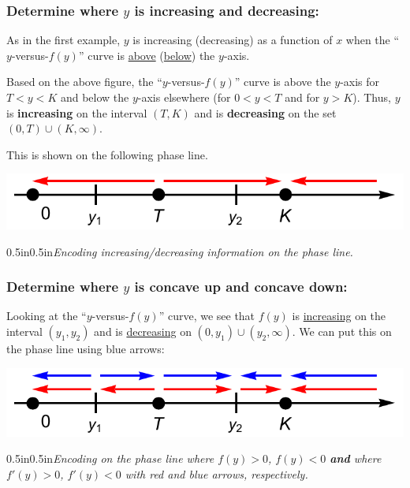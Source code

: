 \documentclass[12pt]{article}
\theoremstyle{definition}
\theoremstyle{underl}
\newcommand{\capt}[1]{\begin{adjustwidth}{0.5in}{0.5in}\centering\small\textit{#1}\end{adjustwidth}}
\begin{document}
	\subsubsection*{Determine where $y$ is increasing and decreasing:}\par
	As in the first example, $y$ is increasing (decreasing) as a function of $x$ when the ``$y$-versus-$f(y)$'' curve is \ul{above} (\ul{below}) the $y$-axis.
	
	Based on the above figure, the ``$y$-versus-$f(y)$'' curve is above the $y$-axis for $T<y<K$ and below the $y$-axis elsewhere (for $0<y<T$ and for $y>K$). Thus, $y$ is \textbf{increasing} on the interval $(T,K)$ and is \textbf{decreasing} on the set $(0,T)\cup(K,\infty)$.
	
	This is shown on the following phase line.
	
	\begin{center}
		\includegraphics[align=c,scale=0.75]{Ex2_Phase_3}
		\vspace{1.5mm}
		\capt{Encoding increasing/decreasing information on the phase line.}
	\end{center}

	\subsubsection*{Determine where $y$ is concave up and concave down:}\par
	Looking at the ``$y$-versus-$f(y)$'' curve, we see that $f(y)$ is \ul{increasing} on the interval $(y_1,y_2)$ and is \ul{decreasing} on $(0,y_1)\cup(y_2,\infty)$. We can put this on the phase line using blue arrows:
	\begin{center}
		\includegraphics[align=c,scale=0.75]{Ex2_Phase_4}
		\vspace{1.5mm}
		\capt{Encoding on the phase line where $f(y)>0$, $f(y)<0$ \textbf{and} where $f'(y)>0$, $f'(y)<0$ with red and blue arrows, respectively.}
	\end{center}
\end{document}
